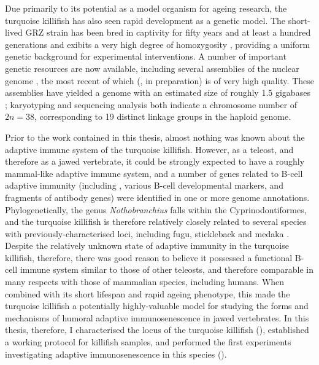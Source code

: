 Due primarily to its potential as a model organism for ageing research, the turquoise killifish has also seen rapid development as a genetic model. The short-lived GRZ strain has been bred in captivity for fifty years and at least a hundred generations \parencite{terzibasi2007review} and exibits a very high degree of homozygosity \parencite{kirschner2012map,reichwald2009genome,valenzano2009map}, providing a uniform genetic background for experimental interventions. A number of important genetic resources are now available, including several assemblies of the nuclear genome \parencite{reichwald2015genome,valenzano2015genome,willemsen2019popgen}, the most recent of which (\parencite{willemsen2019popgen}, in preparation) is of very high quality. These assemblies have yielded a genome with an estimated size of roughly 1.5 gigabases \parencite{willemsen2019popgen};
karyotyping \parencite{reichwald2009genome} and sequencing analysis \parencite{reichwald2015genome} both indicate a chromosome number of $2n = 38$, corresponding to 19 distinct linkage groups in the haploid genome.

Prior to the work contained in this thesis, almost nothing was known about the adaptive immune system of the turquoise killifish. However, as a teleost, and therefore as a jawed vertebrate, it could be strongly expected to have a roughly mammal-like adaptive immune system, and a number of genes related to B-cell adaptive immunity (including , various B-cell developmental markers, and fragments of antibody genes) were identified in one or more genome annotations. Phylogenetically, the genus \textit{Nothobranchius} falls within the Cyprinodontiformes, and the turquoise killifish is therefore relatively closely related to several species with previously-characterised \igh{} loci, including fugu, stickleback and medaka \parencite{terzibasi2007review,hughes2018teleostphylo}. Despite the relatively unknown state of adaptive immunity in the turquoise killifish, therefore, there was good reason to believe it possessed a functional B-cell immune system similar to those of other teleosts, and therefore comparable in many respects with those of mammalian species, including humans. When combined with its short lifespan and rapid ageing phenotype, this made the turquoise killifish a potentially highly-valuable model for studying the forms and mechanisms of humoral adaptive immunosenescence in jawed vertebrates. In this thesis, therefore, I characterised the \igh{} locus of the turquoise killifish (), established a working \igseq protocol for killifish samples, and performed the first experiments investigating adaptive immunosenescence in this species ().

